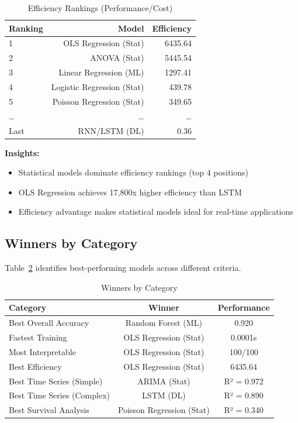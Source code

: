 \documentclass[11pt,a4paper]{article}
\begin{document}
\begin{table}[h]
\centering
\begin{tabular}{lrr}
\toprule
\textbf{Ranking} & \textbf{Model} & \textbf{Efficiency} \\
\midrule
1 & OLS Regression (Stat) & \textcolor{accentcolor}{6435.64} \\
2 & ANOVA (Stat) & \textcolor{accentcolor}{5445.54} \\
3 & Linear Regression (ML) & 1297.41 \\
4 & Logistic Regression (Stat) & 439.78 \\
5 & Poisson Regression (Stat) & 349.65 \\
\ldots & \ldots & \ldots \\
Last & RNN/LSTM (DL) & 0.36 \\
\bottomrule
\end{tabular}
\caption{Efficiency Rankings (Performance/Cost)}
\label{tab:efficiency}
\end{table}

\textbf{Insights:}
\begin{itemize}
    \item Statistical models dominate efficiency rankings (top 4 positions)
    \item OLS Regression achieves 17,800x higher efficiency than LSTM
    \item Efficiency advantage makes statistical models ideal for real-time applications
\end{itemize}

\subsection{Winners by Category}

Table~\ref{tab:winners} identifies best-performing models across different criteria.

\begin{table}[h]
\centering
\begin{tabular}{lcc}
\toprule
\textbf{Category} & \textbf{Winner} & \textbf{Performance} \\
\midrule
Best Overall Accuracy & Random Forest (ML) & 0.920 \\
Fastest Training & OLS Regression (Stat) & 0.0001s \\
Most Interpretable & OLS Regression (Stat) & 100/100 \\
Best Efficiency & OLS Regression (Stat) & 6435.64 \\
Best Time Series (Simple) & ARIMA (Stat) & R² = 0.972 \\
Best Time Series (Complex) & LSTM (DL) & R² = 0.890 \\
Best Survival Analysis & Poisson Regression (Stat) & R² = 0.340 \\
\bottomrule
\end{tabular}
\caption{Winners by Category}
\label{tab:winners}
\end{table}
\end{document}

